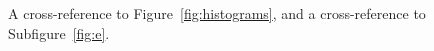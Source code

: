 A cross-reference to Figure~\ref{fig:histograms}, and a cross-reference to Subfigure~\ref{fig:e}.









